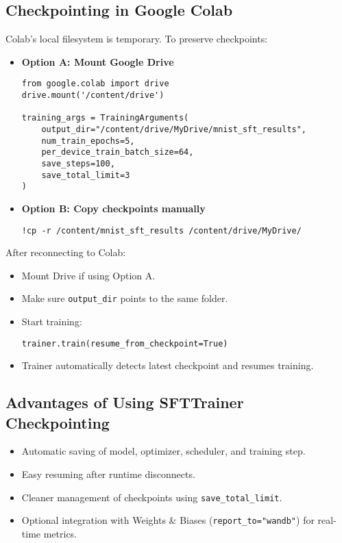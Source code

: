 \subsection{Checkpointing in Google Colab}
Colab's local filesystem is temporary. To preserve checkpoints:
\begin{tcolorbox}[colback=blue!5!white, colframe=blue!75!black, title=Resume Training in Colab]
\begin{itemize}
    \item \textbf{Option A: Mount Google Drive}
    
    \begin{verbatim}
from google.colab import drive
drive.mount('/content/drive')

training_args = TrainingArguments(
    output_dir="/content/drive/MyDrive/mnist_sft_results",
    num_train_epochs=5,
    per_device_train_batch_size=64,
    save_steps=100,
    save_total_limit=3
)
    \end{verbatim}
    \item \textbf{Option B: Copy checkpoints manually}
    \begin{verbatim}
!cp -r /content/mnist_sft_results /content/drive/MyDrive/
    \end{verbatim}
\end{itemize}
\end{tcolorbox}

\begin{tcolorbox}[colback=blue!5!white, colframe=blue!75!black, title=Resume Training in Colab]
After reconnecting to Colab:
\begin{itemize}
    \item Mount Drive if using Option A.
    \item Make sure \texttt{output\_dir} points to the same folder.
    \item Start training:
\begin{verbatim}
trainer.train(resume_from_checkpoint=True)
\end{verbatim}
    \item Trainer automatically detects latest checkpoint and resumes training.
\end{itemize}
\end{tcolorbox}

\subsection{Advantages of Using SFTTrainer Checkpointing}
\begin{itemize}
    \item Automatic saving of model, optimizer, scheduler, and training step.
    \item Easy resuming after runtime disconnects.
    \item Cleaner management of checkpoints using \texttt{save\_total\_limit}.
    \item Optional integration with Weights \& Biases (\texttt{report\_to="wandb"}) for real-time metrics.
\end{itemize}

